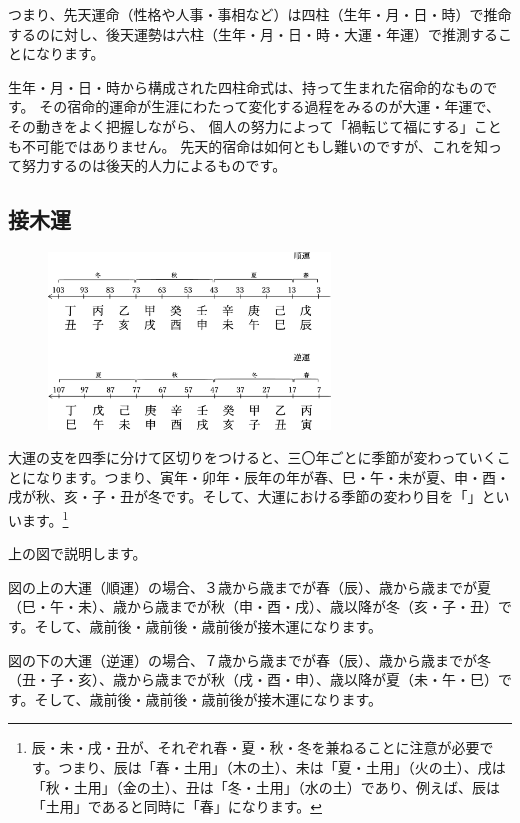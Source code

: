 \documentclass[a5paper,11pt,dvipdfmx]{tarticle}
\begin{document}
つまり、先天運命（性格や人事・事相など）は四柱（生年・月・日・時）で推命するのに対し、後天運勢は六柱（生年・月・日・時・大運・年運）で推測することになります。

生年・月・日・時から構成された四柱命式は、持って生まれた宿命的なものです。
その宿命的運命が生涯にわたって変化する過程をみるのが大運・年運で、その動きをよく把握しながら、
個人の努力によって「禍転じて福にする」ことも不可能ではありません。
先天的宿命は如何ともし難いのですが、これを知って努力するのは後天的人力によるものです。

\subsection{接木運}

\begin{figure}
  \includegraphics[width=75mm,angle=90]{figs/figure4-8.eps}
\end{figure}

大運の支を四季に分けて区切りをつけると、三〇年ごとに季節が変わっていくことになります。つまり、寅年・卯年・辰年の年が春、巳・午・未が夏、申・酉・戌が秋、亥・子・丑が冬です。そして、大運における季節の変わり目を「」といいます。\footnote{辰・未・戌・丑が、それぞれ春・夏・秋・冬を兼ねることに注意が必要です。つまり、辰は「春・土用」（木の土）、未は「夏・土用」（火の土）、戌は「秋・土用」（金の土）、丑は「冬・土用」（水の土）であり、例えば、辰は「土用」であると同時に「春」になります。}

上の図で説明します。

図の上の大運（順運）の場合、３歳から歳までが春（辰）、歳から歳までが夏（巳・午・未）、歳から歳までが秋（申・酉・戌）、歳以降が冬（亥・子・丑）です。そして、歳前後・歳前後・歳前後が接木運になります。

図の下の大運（逆運）の場合、７歳から歳までが春（辰）、歳から歳までが冬（丑・子・亥）、歳から歳までが秋（戌・酉・申）、歳以降が夏（未・午・巳）です。そして、歳前後・歳前後・歳前後が接木運になります。
\end{document}
